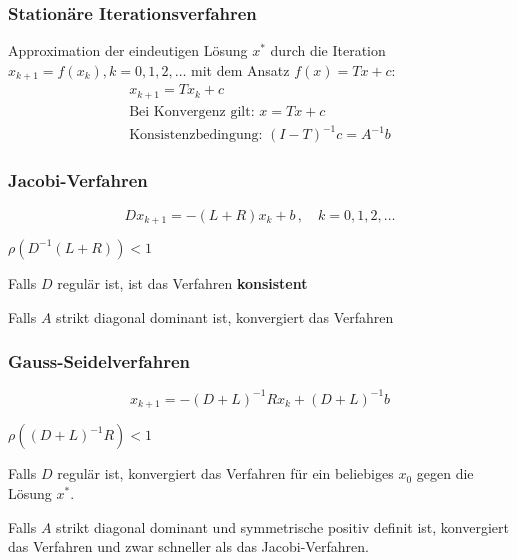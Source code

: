 		\subsubsection{Stationäre Iterationsverfahren}
			Approximation der eindeutigen Lösung $x^*$ durch die Iteration $x_{k+1} = f(x_k), k= 0, 1, 2, \dots$ mit dem Ansatz $f(x) = Tx + c$:
			\begin{gather*}
				x_{k+1} = T x_k + c \\
				\text{Bei Konvergenz gilt: } x = Tx + c \\
				\text{Konsistenzbedingung: } (I-T)^{-1}c = A^{-1}b
			\end{gather*}

		\subsubsection{Jacobi-Verfahren}
			\[ 
				Dx_{k+1} = -(L+R)x_k + b\,,\quad k = 0,1,2,\dots
			\]
			
			\begin{bedingung}
				$\rho(D^{-1}(L+R)) < 1$
			\end{bedingung}
			
			\begin{bemerkungen}
				\item Falls $D$ regulär ist, ist das Verfahren \textbf{konsistent}
				\item Falls $A$ strikt diagonal dominant ist, konvergiert das Verfahren
			\end{bemerkungen}
			
		\subsubsection{Gauss-Seidelverfahren}
			\[
				x_{k+1} = -(D+L)^{-1} R x_k + (D+L)^{-1}b
			\]
			
			\begin{bedingung}
				$\rho((D+L)^{-1}R)<1$
			\end{bedingung}
			
			\begin{bemerkungen}
				\item Falls $D$ regulär ist, konvergiert das Verfahren für ein beliebiges $x_0$ gegen die Lösung $x^*$.
				\item Falls $A$ strikt diagonal dominant und symmetrische positiv definit ist, konvergiert das Verfahren und zwar schneller als das Jacobi-Verfahren.
			\end{bemerkungen}
			
